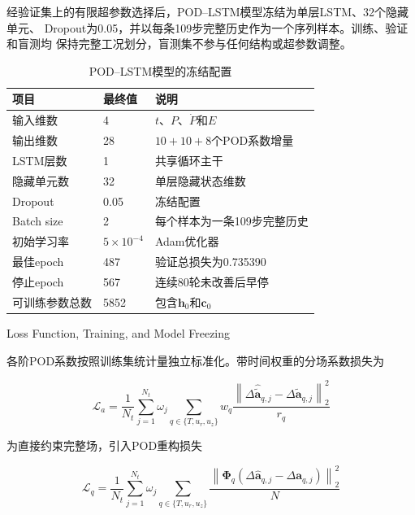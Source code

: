 经验证集上的有限超参数选择后，POD--LSTM模型冻结为单层LSTM、32个隐藏单元、
Dropout为0.05，并以每条109步完整历史作为一个序列样本。训练、验证和盲测均
保持完整工况划分，盲测集不参与任何结构或超参数调整。

\begin{table}[htbp]
	\centering
	\caption{POD--LSTM模型的冻结配置}
	\label{tab:formal_lstm_configuration}
	\begin{tabularx}{\textwidth}
		{XXX}
		\toprule
		项目 & 最终值 & 说明 \\
		\midrule
		输入维数 & 4 & $t$、$P$、$\dot P$和$E$ \\
		输出维数 & 28 & $10+10+8$个POD系数增量 \\
		LSTM层数 & 1 & 共享循环主干 \\
		隐藏单元数 & 32 & 单层隐藏状态维数 \\
		Dropout & 0.05 & 冻结配置 \\
		Batch size & 2 & 每个样本为一条109步完整历史 \\
		初始学习率 & $5\times10^{-4}$ & Adam优化器 \\
		最佳epoch & 487 & 验证总损失为0.735390 \\
		停止epoch & 567 & 连续80轮未改善后早停 \\
		可训练参数总数 & 5852 & 包含$\boldsymbol h_0$和$\boldsymbol c_0$ \\
		\bottomrule
	\end{tabularx}
\end{table}


{Loss Function, Training, and Model Freezing}

各阶POD系数按照训练集统计量独立标准化。带时间权重的分场系数损失为

\begin{equation}
	\mathcal L_a
	=
	\frac{1}{N_t}
	\sum_{j=1}^{N_t}
	\omega_j
	\sum_{q\in\{T,u_r,u_z\}}
	w_q
	\frac{
		\left\|
		\Delta\widehat{\widetilde{\boldsymbol a}}_{q,j}
		-
		\Delta\widetilde{\boldsymbol a}_{q,j}
		\right\|_2^2
	}{r_q}
	\label{eq:formal_lstm_coefficient_loss}
\end{equation}

为直接约束完整场，引入POD重构损失

\begin{equation}
	\mathcal L_q
	=
	\frac{1}{N_t}
	\sum_{j=1}^{N_t}
	\omega_j
	\sum_{q\in\{T,u_r,u_z\}}
	\frac{
		\left\|
		\boldsymbol\Phi_q
		\left(
		\Delta\widehat{\boldsymbol a}_{q,j}
		-
		\Delta\boldsymbol a_{q,j}
		\right)
		\right\|_2^2
	}{N}
	\label{eq:formal_lstm_field_loss}
\end{equation}

